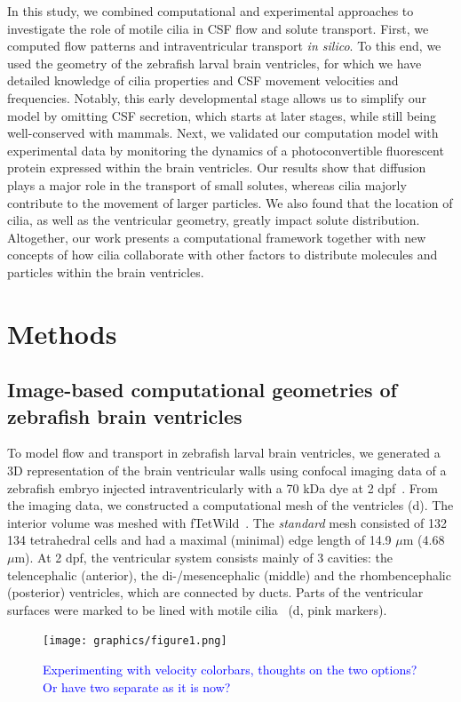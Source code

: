 \documentclass[fleqn]{wlscirep}
\newcommand{\lyng}[1]{\textcolor{blue}{#1}}
\begin{document}
In this study, we combined computational and experimental approaches to investigate the role of motile cilia in CSF flow and solute transport.
First, we computed flow patterns and intraventricular transport \emph{in silico}. To this end, we used the geometry of the zebrafish larval brain ventricles,
for which we have detailed knowledge of cilia properties and CSF movement velocities and frequencies.
Notably, this early developmental stage allows us to simplify our model by omitting CSF secretion, which starts at later stages, while still being well-conserved with mammals.
Next, we validated our computation model with experimental data by monitoring the dynamics of a photoconvertible fluorescent protein expressed within the brain ventricles.
Our results show that diffusion plays a major role in the transport of small solutes, whereas cilia majorly contribute to the movement of larger particles.
We also found that the location of cilia, as well as the ventricular geometry, greatly impact solute distribution.
Altogether, our work presents a computational framework together with new concepts of how cilia
collaborate with other factors to distribute molecules and particles within the brain ventricles. 

\section*{Methods}
\subsection*{Image-based computational geometries of zebrafish brain ventricles}
To model flow and transport in zebrafish larval brain ventricles, we generated a 3D representation of the brain ventricular walls using confocal imaging data of a zebrafish embryo
injected intraventricularly with a 70 kDa dye at 2 dpf~\cite{Olstad2019CiliaryDevelopment}. 
From the imaging data, we constructed a computational mesh of the ventricles (d).
The interior volume was meshed with fTetWild~\cite{Hu2020FastWild}. 
The \emph{standard} mesh consisted of 132 134 tetrahedral cells and had a maximal (minimal) edge length of 14.9 $\mu$m (4.68 $\mu$m). 
At 2 dpf, the ventricular system consists mainly of 3 cavities: the telencephalic (anterior),
the di-/mesencephalic (middle) and the rhombencephalic (posterior) ventricles, which are connected by ducts. 
Parts of the ventricular surfaces were marked to be lined with
motile cilia~\cite{Olstad2019CiliaryDevelopment} (d, pink markers).
\begin{figure}%
    \centering
    \texttt{[image: graphics/figure1.png]}
    \caption{\lyng{Experimenting with velocity colorbars, thoughts on the two options? Or have two separate as it is now?}}
    \label{fig:figure1}
\end{figure}
\end{document}
